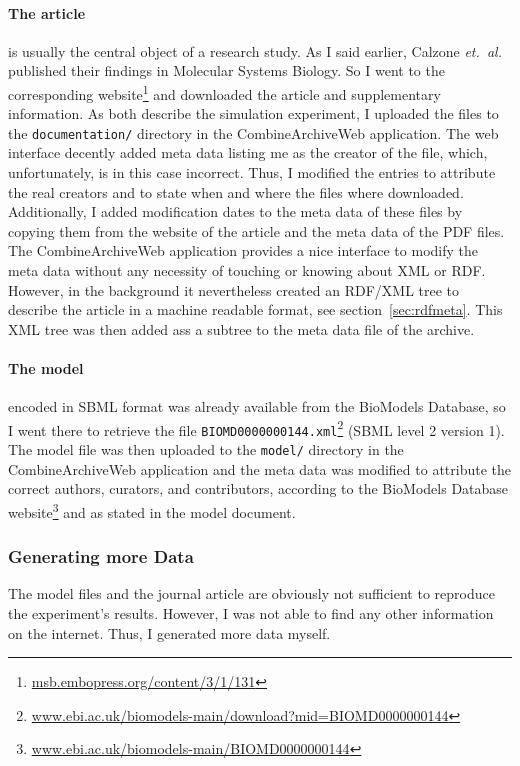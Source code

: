 \paragraph{The article} is usually the central object of a research study. As I said earlier, Calzone \emph{et.~al.} published their findings in Molecular Systems Biology. So I went to the corresponding website\footnote{\href{http://msb.embopress.org/content/3/1/131}{msb.embopress.org/content/3/1/131}} and downloaded the article and supplementary information.
As both describe the simulation experiment, I uploaded the files to the \texttt{documentation/} directory in the CombineArchiveWeb application.
The web interface decently added meta data listing me as the creator of the file, which, unfortunately, is in this case incorrect.
Thus, I modified the entries to attribute the real creators and to state when and where the files where downloaded.
Additionally, I added modification dates to the meta data of these files by copying them from the website of the article and the meta data of the PDF files.
The CombineArchiveWeb application provides a nice interface to modify the meta data without any necessity of touching or knowing about XML or RDF.
However, in the background it nevertheless created an RDF/XML tree to describe the article in a machine readable format, see section~\ref{sec:rdfmeta}.
This XML tree was then added ass a subtree to the meta data file of the archive.


\paragraph{The model} encoded in SBML format was already available from the BioModels Database, so I went there to retrieve the file \texttt{BIOMD0000000144.xml}\footnote{\href{http://www.ebi.ac.uk/biomodels-main/download?mid=BIOMD0000000144}{www.ebi.ac.uk/biomodels-main/download?mid=BIOMD0000000144}} (SBML level 2 version 1).
The model file was then uploaded to the \texttt{model/} directory in the CombineArchiveWeb application and the meta data was modified to attribute the correct authors, curators, and contributors, according to the BioModels Database website\footnote{\href{http://www.ebi.ac.uk/biomodels-main/BIOMD0000000144}{www.ebi.ac.uk/biomodels-main/BIOMD0000000144}} and as stated in the model document.


\subsubsection{Generating more Data}
The model files and the journal article are obviously not sufficient to reproduce the experiment's results.
However, I was not able to find any other information on the internet.
Thus, I generated more data myself.

